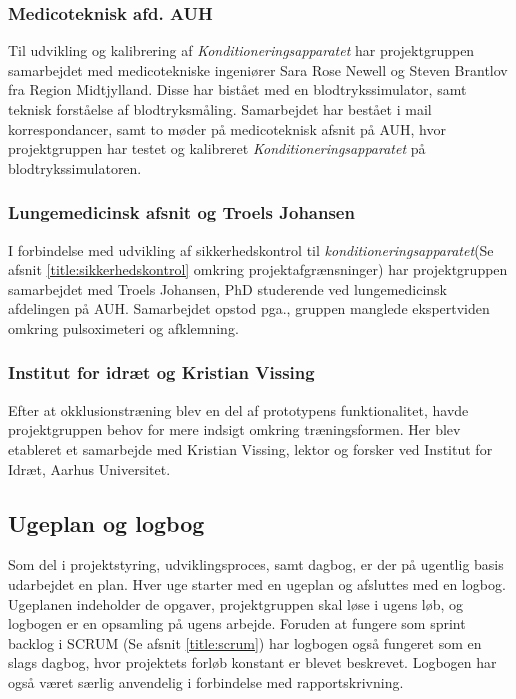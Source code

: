 \subsubsection{Medicoteknisk afd. AUH}
Til udvikling og kalibrering af \textit{Konditioneringsapparatet} har projektgruppen samarbejdet med medicotekniske ingeniører  Sara Rose Newell og Steven Brantlov fra Region Midtjylland. Disse har bistået med en blodtrykssimulator, samt teknisk forståelse af blodtryksmåling. Samarbejdet har bestået i mail korrespondancer, samt to møder på medicoteknisk afsnit på AUH, hvor projektgruppen har testet og kalibreret \textit{Konditioneringsapparatet} på blodtrykssimulatoren. 

\subsubsection{Lungemedicinsk afsnit og Troels Johansen}
I forbindelse med udvikling af sikkerhedskontrol til \textit{konditioneringsapparatet}(Se afsnit \ref{title:sikkerhedskontrol} omkring projektafgrænsninger) har projektgruppen samarbejdet med Troels Johansen, PhD studerende ved lungemedicinsk afdelingen på AUH. Samarbejdet opstod pga.,  gruppen manglede ekspertviden omkring pulsoximeteri og afklemning.

\subsubsection{Institut for idræt og Kristian Vissing} 
Efter at okklusionstræning blev en del af prototypens funktionalitet, havde projektgruppen behov for mere indsigt omkring træningsformen. Her blev etableret et samarbejde med Kristian Vissing, lektor og forsker ved Institut for Idræt, Aarhus Universitet.  

\subsection{Ugeplan og logbog}
Som del i projektstyring, udviklingsproces, samt dagbog, er der på ugentlig basis udarbejdet en plan. Hver uge starter med en ugeplan og afsluttes med en logbog. Ugeplanen indeholder de opgaver, projektgruppen skal løse i ugens løb, og logbogen er en opsamling på ugens arbejde. Foruden at fungere som sprint backlog i SCRUM (Se afsnit \ref{title:scrum}) har logbogen også fungeret som en slags dagbog, hvor projektets forløb konstant er blevet beskrevet. Logbogen har også været særlig anvendelig i forbindelse med rapportskrivning. 

